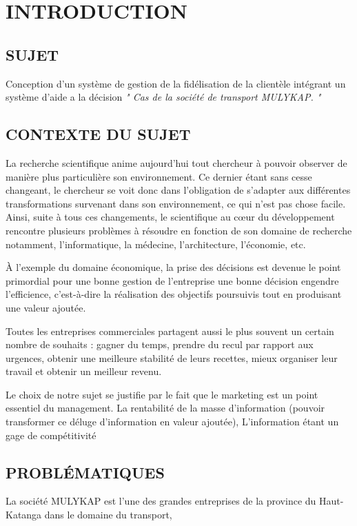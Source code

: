 \documentclass[a4paper,12pt,oneside]{book}
\begin{document}
\chapter*{INTRODUCTION}
\section[Sujet]{SUJET}
Conception d’un système de gestion de la fidélisation
de la clientèle intégrant un système d’aide a la décision 
\textit{" Cas de la société de transport MULYKAP. "}
\section[Context du sujet]{CONTEXTE DU SUJET}
La recherche scientifique anime aujourd’hui tout chercheur 
à pouvoir observer de manière
plus particulière son environnement. Ce dernier étant 
sans cesse changeant, le chercheur se voit donc
dans l’obligation de s’adapter aux différentes transformations
survenant dans son environnement, ce qui n’est pas chose facile.
Ainsi, suite à tous ces changements, le scientifique au cœur du
développement rencontre plusieurs problèmes à résoudre en 
fonction de son domaine de recherche notamment, l’informatique,
la médecine, l’architecture, l’économie, etc.
\newline

À l’exemple du domaine
économique, la prise des décisions est devenue
le point primordial pour une bonne gestion de
l’entreprise une bonne décision engendre l’efficience,
c’est-à-dire la réalisation des objectifs
poursuivis tout en produisant une valeur ajoutée.
\newline

Toutes les entreprises commerciales partagent aussi
le plus souvent un certain nombre de souhaits : gagner
du temps, prendre du recul par rapport aux urgences, obtenir une meilleure
stabilité de leurs recettes, mieux organiser leur travail et obtenir un meilleur
revenu. \cite*{Barouch2010}
\newline

Le choix de notre sujet se justifie par le fait que le marketing 
est un point essentiel du management.
La rentabilité de la masse d’information (pouvoir transformer
ce déluge d’information en valeur ajoutée), L’information étant
un gage de compétitivité %
\section[Problématique]{PROBLÉMATIQUES}
La société MULYKAP est l’une des grandes entreprises
de la province du Haut-Katanga dans le domaine du transport,
\end{document}
